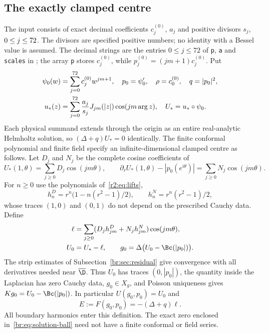 \subsection{The exactly clamped centre}\label{br:sec:centre}
The input consists of exact decimal coefficients
$c_j^{(0)}$, $a_j$ and positive divisors $s_j$, $0\le j\le72$.
The divisors are specified positive numbers; no identity with a Bessel
value is assumed. The decimal strings are the entries $0\le j\le72$
of \texttt{p}, \texttt{a} and \texttt{scales} in
; the array \texttt{p} stores
$c_j^{(0)}$, while $p_j^{(0)}=(jm+1)c_j^{(0)}$. Put
\begin{equation}\label{br:eq:input}
 \begin{split}
 \psi_0(w)&=\sum_{j=0}^{72}c_j^{(0)}w^{jm+1},\quad
 p_0=\psi_0',\quad \rho=c_0^{(0)},\quad q=|p_0|^2,\\
 u_*(z)&=\sum_{j=0}^{72}\frac{a_j}{s_j}
 J_{jm}(|z|)\cos(jm\arg z),\quad U_*=u_*\circ\psi_0.
 \end{split}
\end{equation}
Each physical summand extends through the origin as an entire real-analytic
Helmholtz solution, so $(\Delta+q)U_*=0$ identically.
The finite conformal polynomial and finite field specify an infinite-dimensional
clamped centre as follows. Let $D_j$ and $N_j$ be the complete cosine
coefficients of
\begin{equation}\label{br:eq:defects}
 U_*(1,\theta)=\sum_{j\ge0}D_j\cos(jm\theta),\qquad
 \partial_rU_*(1,\theta)-|p_0(e^{i\theta})|
 =\sum_{j\ge0}N_j\cos(jm\theta).
\end{equation}
For $n\ge0$ use the polynomials of~\eqref{r2:eq:lifts},
\[
 h_n^D=r^n\bigl(1-n(r^2-1)/2\bigr),\qquad
 h_n^N=r^n(r^2-1)/2,
\]
whose traces $(1,0)$ and $(0,1)$ do not depend on the prescribed Cauchy
data. Define
\begin{equation}\label{br:eq:centre}
 \begin{split}
 \ell&=\sum_{j\ge0}(D_jh_{jm}^D+N_jh_{jm}^N)\cos(jm\theta),\\
 U_0&=U_*-\ell,\qquad
 g_0=\Delta\bigl(U_0-\Bc(|p_0|)\bigr).
 \end{split}
\end{equation}
The strip estimates of Subsection~\ref{br:sec:residual} give convergence with
all derivatives needed near $\overline\D$. Thus $U_0$ has traces
$(0,|p_0|)$, the quantity inside the Laplacian has zero Cauchy data,
$g_0\in X_g$, and Poisson uniqueness gives
$Kg_0=U_0-\Bc(|p_0|)$. In particular $U(g_0,p_0)=U_0$ and
\begin{equation}\label{br:eq:E}
 E:=F(g_0,p_0)=-(\Delta+q)\ell.
\end{equation}
All boundary harmonics enter this definition. The exact zero enclosed
in~\eqref{br:eq:solution-ball} need not have a finite conformal or field
series.
